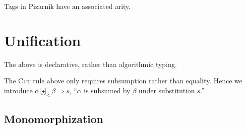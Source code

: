 \documentclass{article}
\begin{document}
Tags in Pizarnik have an associated arity.




\section{Unification}

The above is declarative, rather than algorithmic typing.

The \textsc{Cut} rule above only requires subsumption rather than equality. Hence we introduce $\alpha \biguplus_\sphericalangle \beta \Rightarrow s$, ``$\alpha$ is subsumed by $\beta$ under substitution $s$.''



\subsection{Monomorphization}

\end{document}
